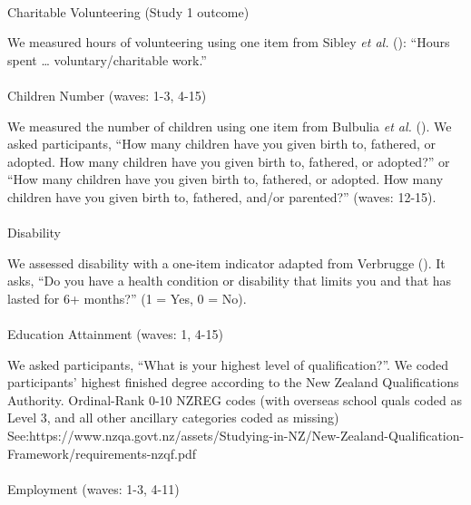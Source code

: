 \documentclass[
  single column]{article}
\makeatletter
\let\oldparagraph\paragraph
\renewcommand{\paragraph}{
    \@ifstar
      \xxxParagraphStar
      \xxxParagraphNoStar
  }
\newcommand{\xxxParagraphStar}[1]{\oldparagraph*{#1}\mbox{}}
\newcommand{\xxxParagraphNoStar}[1]{\oldparagraph{#1}\mbox{}}
\makeatother
\begin{document}
\paragraph{Charitable Volunteering (Study 1
outcome)}\label{charitable-volunteering-study-1-outcome}

We measured hours of volunteering using one item from Sibley \emph{et
al.} (): ``Hours spent \ldots{}
voluntary/charitable work.''

\paragraph{Children Number (waves: 1-3,
4-15)}\label{children-number-waves-1-3-4-15}

We measured the number of children using one item from Bulbulia \emph{et
al.} (). We asked participants, ``How
many children have you given birth to, fathered, or adopted. How many
children have you given birth to, fathered, or adopted?'' or ``How many
children have you given birth to, fathered, or adopted. How many
children have you given birth to, fathered, and/or parented?'' (waves:
12-15).

\paragraph{Disability}\label{disability}

We assessed disability with a one-item indicator adapted from Verbrugge
(). It asks, ``Do you have a health
condition or disability that limits you and that has lasted for 6+
months?'' (1 = Yes, 0 = No).

\paragraph{Education Attainment (waves: 1,
4-15)}\label{education-attainment-waves-1-4-15}

We asked participants, ``What is your highest level of qualification?''.
We coded participants' highest finished degree according to the New
Zealand Qualifications Authority. Ordinal-Rank 0-10 NZREG codes (with
overseas school quals coded as Level 3, and all other ancillary
categories coded as missing)
See:https://www.nzqa.govt.nz/assets/Studying-in-NZ/New-Zealand-Qualification-Framework/requirements-nzqf.pdf

\paragraph{Employment (waves: 1-3,
4-11)}\label{employment-waves-1-3-4-11}
\end{document}
